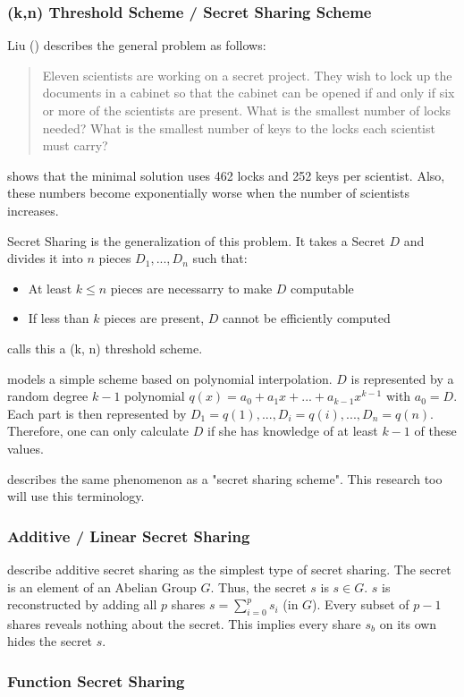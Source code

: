 \label{ch_FunctionSecretSharing}
\subsubsection{(k,n) Threshold Scheme / Secret Sharing Scheme}
\label{sub_threshold_scheme}
Liu (\cite{liu1968combMath}) describes the general problem as follows: 
\begin{quote}
Eleven scientists are working on a secret project. 
They wish to lock up the documents in a cabinet so that the cabinet can be opened if and only if six or more of the scientists are present.
What is the smallest number of locks needed?
What is the smallest number of keys to the locks each scientist must carry?
\end{quote}
\cite{shamir1979share} shows that the minimal solution uses 462 locks and 252 keys per scientist.
Also, these numbers become exponentially worse when the number of scientists increases.

Secret Sharing is the generalization of this problem.
It takes a Secret $D$ and divides it into $n$ pieces $D_1,...,D_n$ such that:
\begin{itemize}
    \item At least $k\leq n$ pieces are necessarry to make $D$ computable
    \item If less than $k$ pieces are present, $D$ cannot be efficiently computed
\end{itemize}
\cite{shamir1979share} calls this a (k, n) threshold scheme.

\cite{shamir1979share} models a simple scheme based on polynomial interpolation.
$D$ is represented by a random degree $k-1$ polynomial $q(x)=a_0+a_1x+...+a_{k-1}x^{k-1}$ with $a_0=D$.
Each part is then represented by $D_1=q(1),...,D_i=q(i),...,D_n=q(n)$.
Therefore, one can only calculate $D$ if she has knowledge of at least $k-1$ of these values.  

\cite{boyle2015function} describes the same phenomenon as a "secret sharing scheme". 
This research too will use this terminology.

\subsubsection{Additive / Linear Secret Sharing}
\label{sub_additive_secret_sharing}
\cite{boyle2015function} describe additive secret sharing as the simplest type of secret sharing.
The secret is an element of an Abelian Group $G$.
Thus, the secret $s$ is $s\in G$.
$s$ is reconstructed by adding all $p$ shares $s=\sum_{i=0}^p s_i$ (in $G$). 
Every subset of $p-1$ shares reveals nothing about the secret.
This implies every share $s_b$ on its own hides the secret $s$.

\subsubsection{Function Secret Sharing}
\label{sub_function_secret_sharing}